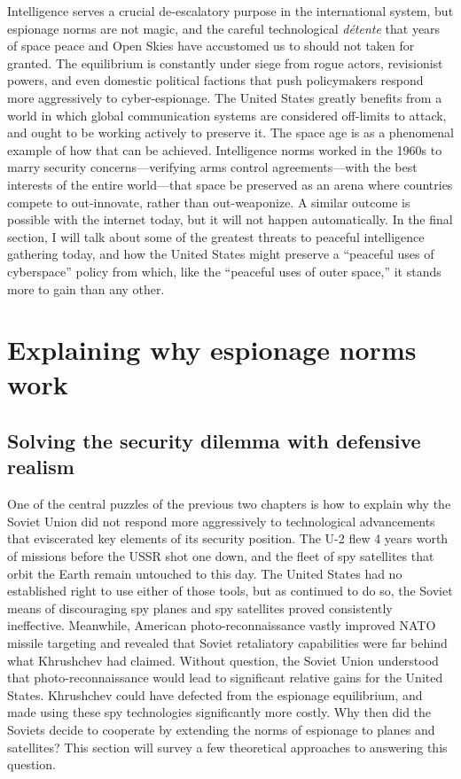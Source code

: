 \documentclass{report}
\begin{document}
Intelligence serves a crucial de-escalatory purpose in the international system, but espionage norms are not magic, and the careful technological \emph{d\'etente} that years of space peace and Open Skies have accustomed us to should not taken for granted. The equilibrium is constantly under siege from rogue actors, revisionist powers, and even domestic political factions that push policymakers respond more aggressively to cyber-espionage. The United States greatly benefits from a world in which global communication systems are considered off-limits to attack, and ought to be working actively to preserve it. The space age is as a phenomenal example of how that can be achieved. Intelligence norms worked in the 1960s to marry security concerns---verifying arms control agreements---with the best interests of the entire world---that space be preserved as an arena where countries compete to out-innovate, rather than out-weaponize. A similar outcome is possible with the internet today, but it will not happen automatically. In the final section, I will talk about some of the greatest threats to peaceful intelligence gathering today, and how the United States might preserve a ``peaceful uses of cyberspace'' policy from which, like the ``peaceful uses of outer space,'' it stands more to gain than any other.

\section{Explaining why espionage norms work}
\subsection{Solving the security dilemma with defensive realism}

One of the central puzzles of the previous two chapters is how to explain why the Soviet Union did not respond more aggressively to technological advancements that eviscerated key elements of its security position. The U-2 flew 4 years worth of missions before the USSR shot one down, and the fleet of spy satellites that orbit the Earth remain untouched to this day. The United States had no established right to use either of those tools, but as continued to do so, the Soviet means of discouraging spy planes and spy satellites proved consistently ineffective. Meanwhile, American photo-reconnaissance vastly improved NATO missile targeting and revealed that Soviet retaliatory capabilities were far behind what Khrushchev had claimed. Without question, the Soviet Union understood that photo-reconnaissance would lead to significant relative gains for the United States. Khrushchev could have defected from the espionage equilibrium, and made using these spy technologies significantly more costly. Why then did the Soviets decide to cooperate by extending the norms of espionage to planes and satellites? This section will survey a few theoretical approaches to answering this question.
\end{document}
